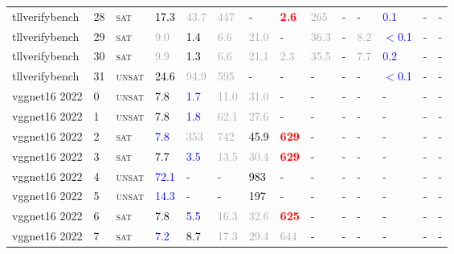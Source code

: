 \begin{center}
{\begin{longtable}{@{}llllllllllllll@{}}
tllverifybench & 28 & \textsc{sat} & \textcolor{black}{17.3} & \textcolor{darkgray}{43.7} & \textcolor{darkgray}{447} & - & \textbf{\textcolor{red}{2.6}} & \textcolor{darkgray}{265} & - & - & \textcolor{blue}{0.1} & - & - \\
tllverifybench & 29 & \textsc{sat} & \textcolor{darkgray}{9.0} & \textcolor{black}{1.4} & \textcolor{darkgray}{6.6} & \textcolor{darkgray}{21.0} & - & \textcolor{darkgray}{36.3} & - & \textcolor{darkgray}{8.2} & \textcolor{blue}{$<$0.1} & - & - \\
tllverifybench & 30 & \textsc{sat} & \textcolor{darkgray}{9.9} & \textcolor{black}{1.3} & \textcolor{darkgray}{6.6} & \textcolor{darkgray}{21.1} & \textcolor{darkgray}{2.3} & \textcolor{darkgray}{35.5} & - & \textcolor{darkgray}{7.7} & \textcolor{blue}{0.2} & - & - \\
tllverifybench & 31 & \textsc{unsat} & \textcolor{black}{24.6} & \textcolor{darkgray}{94.9} & \textcolor{darkgray}{595} & - & - & - & - & - & \textcolor{blue}{$<$0.1} & - & - \\
vggnet16 2022 & 0 & \textsc{unsat} & \textcolor{black}{7.8} & \textcolor{blue}{1.7} & \textcolor{darkgray}{11.0} & \textcolor{darkgray}{31.0} & - & - & - & - & - & - & - \\
vggnet16 2022 & 1 & \textsc{unsat} & \textcolor{black}{7.8} & \textcolor{blue}{1.8} & \textcolor{darkgray}{62.1} & \textcolor{darkgray}{27.6} & - & - & - & - & - & - & - \\
vggnet16 2022 & 2 & \textsc{sat} & \textcolor{blue}{7.8} & \textcolor{darkgray}{353} & \textcolor{darkgray}{742} & \textcolor{black}{45.9} & \textbf{\textcolor{red}{629}} & - & - & - & - & - & - \\
vggnet16 2022 & 3 & \textsc{sat} & \textcolor{black}{7.7} & \textcolor{blue}{3.5} & \textcolor{darkgray}{13.5} & \textcolor{darkgray}{30.4} & \textbf{\textcolor{red}{629}} & - & - & - & - & - & - \\
vggnet16 2022 & 4 & \textsc{unsat} & \textcolor{blue}{72.1} & - & - & \textcolor{black}{983} & - & - & - & - & - & - & - \\
vggnet16 2022 & 5 & \textsc{unsat} & \textcolor{blue}{14.3} & - & - & \textcolor{black}{197} & - & - & - & - & - & - & - \\
vggnet16 2022 & 6 & \textsc{sat} & \textcolor{black}{7.8} & \textcolor{blue}{5.5} & \textcolor{darkgray}{16.3} & \textcolor{darkgray}{32.6} & \textbf{\textcolor{red}{625}} & - & - & - & - & - & - \\
vggnet16 2022 & 7 & \textsc{sat} & \textcolor{blue}{7.2} & \textcolor{black}{8.7} & \textcolor{darkgray}{17.3} & \textcolor{darkgray}{29.4} & \textcolor{darkgray}{644} & - & - & - & - & - & - \\

\end{longtable}}
\end{center}
